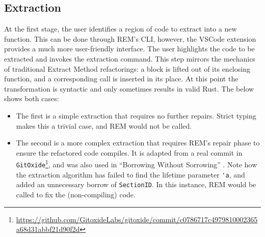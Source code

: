 \subsection{Extraction}


At the first stage, the user identifies a region of code to extract into a new
function. This can be done through REM's CLI, however, the VSCode extension
provides a much more user-friendly interface. The user highlights the code to be
extracted and invokes the extraction command. This step mirrors the mechanics of
traditional Extract Method refactorings: a block is lifted out of its enclosing
function, and a corresponding call is inserted in its place. At this point the
transformation is syntactic and only sometimes results in valid Rust. The below shows both cases:
\begin{itemize}
    \item The first is a simple extraction that requires no further repairs.
    Strict typing makes this a trivial case, and REM would not be called.
    \item The second is a more complex extraction that requires REM's repair
    phase to ensure the refactored code compiles. It is adapted from a real
    commit in \verb|GitOxide|\footnote{\url{https://github.com/GitoxideLabs/gitoxide/commit/c0786717c4979810002365a68d31abbf21d90f2d}},
    and was also used in ``Borrowing Without Sorrowing'' \cite{BorrowingWithoutSorrowing}.
    Note how the extraction algorithm has failed to find the lifetime parameter \verb|'a|, and added an unnecessary borrow of \verb|SectionID|. In this instance, REM would be called to fix the (non-compiling) code.
\end{itemize}

